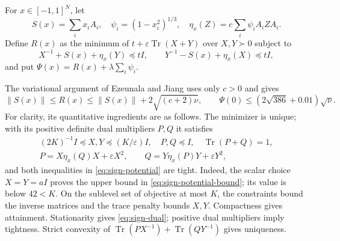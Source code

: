 For $x\in[-1,1]^N$, let
\[
 S(x)=\sum_i x_iA_i,\quad
 \psi_i=(1-x_i^2)^{1/3},\quad
 \eta_x(Z)=c\sum_i\psi_iA_iZA_i.
\]
Define $R(x)$ as the minimum of
$t+\varepsilon\operatorname{Tr}(X+Y)$ over $X,Y\succ0$ subject to
\begin{equation}
 X^{-1}+S(x)+\eta_x(Y)\preceq tI,
 \qquad Y^{-1}-S(x)+\eta_x(X)\preceq tI,
 \label{eq:sign-potential}
\end{equation}
and put $\Psi(x)=R(x)+\lambda\sum_i\psi_i$.

The variational argument of Ezeunala and Jiang
\cite[Section~4.1]{EzeunalaJiang2026} uses only $c>0$ and gives
\begin{equation}
 \|S(x)\|\le R(x)\le\|S(x)\|+2\sqrt{(c+2)\nu},
 \qquad \Psi(0)\le(2\sqrt{386}+0.01)\sqrt\nu.
 \label{eq:sign-potential-bound}
\end{equation}
For clarity, its quantitative ingredients are as follows.  The minimizer
is unique; with its positive definite dual multipliers $P,Q$ it satisfies
\begin{gather}
 (2K)^{-1}I\preceq X,Y\preceq(K/\varepsilon)I,
 \quad P,Q\preceq I,\quad \operatorname{Tr}(P+Q)=1,\nonumber\\
 P=X\eta_x(Q)X+\varepsilon X^2,
 \qquad Q=Y\eta_x(P)Y+\varepsilon Y^2,
 \label{eq:sign-dual}
\end{gather}
and both inequalities in \eqref{eq:sign-potential} are tight.  Indeed,
the scalar choice $X=Y=aI$ proves the upper bound in
\eqref{eq:sign-potential-bound}; its value is below $42<K$.
On the sublevel set of objective at most $K$, the constraints bound the
inverse matrices and the trace penalty bounds $X,Y$.  Compactness gives
attainment.  Stationarity gives \eqref{eq:sign-dual}; positive dual
multipliers imply tightness.  Strict convexity of
$\operatorname{Tr}(PX^{-1})+\operatorname{Tr}(QY^{-1})$ gives uniqueness.

